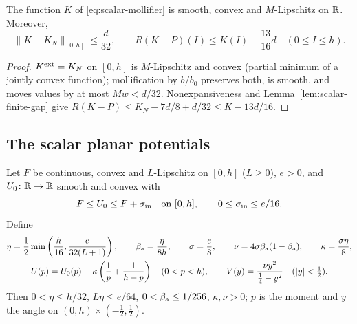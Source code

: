 \begin{proposition}\label{prop:scalar-cmp-gap}
The function $K$ of \eqref{eq:scalar-mollifier} is smooth, convex and $M$-Lipschitz on $\mathbb{R}$. Moreover,
\begin{equation}\label{eq:scalar-smooth-gap}
 \|K-K_N\|_{[0,h]}\le\frac d{32},\qquad
 R(K-P)(I)\le K(I)-\frac{13}{16}d\quad(0\le I\le h).
\end{equation}
{\normalfont {}}
\end{proposition}

\begin{proof}
$K^{\rm ext}=K_N$ on $[0,h]$ is $M$-Lipschitz and convex (partial minimum of a jointly convex function); mollification by $b/b_0$ preserves both, is smooth, and moves values by at most $Mw<d/32$. Nonexpansiveness and Lemma~\ref{lem:scalar-finite-gap} give $R(K-P)\le K_N-7d/8+d/32\le K-13d/16$.
\end{proof}

\subsection{The scalar planar potentials}\label{sec:scalar-potentials}

Let $F$ be continuous, convex and $L$-Lipschitz on $[0,h]$ ($L\ge0$), $e>0$, and $U_0\colon\mathbb{R}\to\mathbb{R}$ smooth and convex with
\begin{equation}\label{eq:scalar-majorant}
 F\le U_0\le F+\sigma_{\rm in}\quad\hbox{on }[0,h],\qquad 0\le\sigma_{\rm in}\le e/16.
\end{equation}
Define
\begin{gather}\label{eq:scalar-planar-constants}
 \eta=\frac12\min\left(\frac h{16},\frac{e}{32(L+1)}\right),\qquad
 \beta_{\rm a}=\frac{\eta}{8h},\qquad \sigma=\frac e8,\qquad
 \nu=4\sigma\beta_{\rm a}(1-\beta_{\rm a}),\qquad \kappa=\frac{\sigma\eta}{8},\\
 U(p)=U_0(p)+\kappa\left(\frac1p+\frac1{h-p}\right)\quad(0<p<h),\qquad
 V(y)=\frac{\nu y^2}{\frac14-y^2}\quad(|y|<\tfrac12).\notag
\end{gather}
Then $0<\eta\le h/32$, $L\eta\le e/64$, $0<\beta_{\rm a}\le1/256$, $\kappa,\nu>0$; $p$ is the moment and $y$ the angle on $(0,h)\times(-\frac12,\frac12)$.

